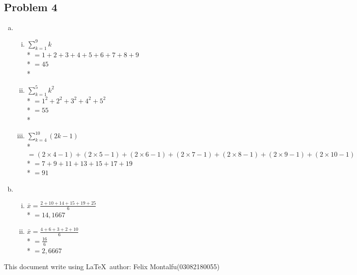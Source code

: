 \documentclass[a4paper]{article}
\begin{document}
  \subsection*{Problem 4}
  \begin{enumerate}[a)]
    \item \begin{enumerate}[i.]
      \item $\sum\limits_{k=1}^{9}k$\\*
      $= 1+2+3+4+5+6+7+8+9$\\*
      $= 45$
      \\*
      \item $\sum\limits_{k=1}^{5}k^2$\\*
      $= 1^2+2^2+3^2+4^2+5^2$\\*
      $= 55$
      \\*
      \item $\sum\limits_{k=4}^{10}(2k-1)$\\*
      $=(2 \times 4 -1)+(2 \times 5 -1)+(2 \times 6 -1)+(2 \times 7 -1)+(2 \times 8 -1)+(2 \times 9 -1)+(2 \times 10 -1)$\\*
      $= 7 + 9 + 11 +13 + 15 + 17 + 19$\\*
      $=91$
    \end{enumerate}
    \item \begin{enumerate}[i.]
      \item $\bar{x} = \frac{2 + 10 + 14 + 15 + 19 + 25}{6}$\\*
      $= 14,1667$
      \item $\bar{x} = \frac{4 + 6 + 3 + 2 + 1 0}{6}$\\*
      $= \frac{16}{6}$\\*
      $=2,6667$
    \end{enumerate}
  \end{enumerate}
  This document write using \LaTeX \ author: Felix Montalfu(03082180055)
\end{document}
